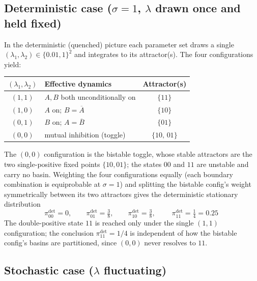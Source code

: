 \documentclass[11pt]{article}
\begin{document}
\subsection{Deterministic case ($\sigma=1$, $\lambda$ drawn once and held fixed)}
\label{sec:quenched}

In the deterministic (quenched) picture each parameter set draws a single
$(\lambda_{1},\lambda_{2})\in\{0.01,1\}^2$ and integrates to its attractor(s).
The four configurations yield:
\begin{center}
\begin{tabular}{clc}
\toprule
$(\lambda_1,\lambda_2)$ & Effective dynamics & Attractor(s) \\
\midrule
$(1,1)$ & $A,B$ both unconditionally on & $\{11\}$ \\
$(1,0)$ & $A$ on; $B=\overline{A}$ & $\{10\}$ \\
$(0,1)$ & $B$ on; $A=\overline{B}$ & $\{01\}$ \\
$(0,0)$ & mutual inhibition (toggle) & $\{10,\,01\}$ \\
\bottomrule
\end{tabular}
\end{center}
The $(0,0)$ configuration is the bistable toggle, whose stable attractors are the
two single-positive fixed points $\{10,01\}$; the states $00$ and $11$ are
unstable and carry no basin. Weighting the four configurations equally (each
boundary combination is equiprobable at $\sigma=1$) and splitting the bistable
config's weight symmetrically between its two attractors gives the deterministic
stationary distribution
\begin{equation}
  \pi^{\det}_{00}=0,\qquad
  \pi^{\det}_{01}=\tfrac{3}{8},\qquad
  \pi^{\det}_{10}=\tfrac{3}{8},\qquad
  \boxed{\;\pi^{\det}_{11}=\tfrac{1}{4}=0.25\;}
  \label{eq:pidet}
\end{equation}
The double-positive state $11$ is reached only under the single $(1,1)$
configuration; the conclusion $\pi^{\det}_{11}=1/4$ is independent of how the
bistable config's basins are partitioned, since $(0,0)$ never resolves to $11$.

\subsection{Stochastic case ($\lambda$ fluctuating)}
\label{sec:annealed}
\end{document}
